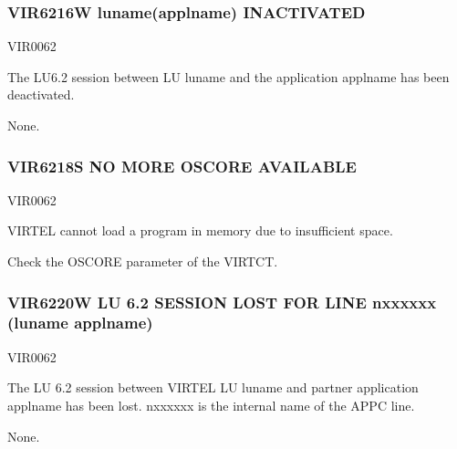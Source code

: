 \documentclass[letterpaper,10pt,english]{sphinxmanual}
\begin{document}
\subsubsection{VIR6216W luname(applname) INACTIVATED}
\label{\detokenize{messages:vir6216w-luname-applname-inactivated}}\begin{description}
\sphinxAtStartPar
VIR0062

\sphinxAtStartPar
The LU6.2 session between LU luname and the application applname has been deactivated.

\sphinxAtStartPar
None.

\end{description}


\subsubsection{VIR6218S NO MORE OSCORE AVAILABLE}
\label{\detokenize{messages:vir6218s-no-more-oscore-available}}\begin{description}
\sphinxAtStartPar
VIR0062

\sphinxAtStartPar
VIRTEL cannot load a program in memory due to insufficient space.

\sphinxAtStartPar
Check the OSCORE parameter of the VIRTCT.

\end{description}


\subsubsection{VIR6220W LU 6.2 SESSION LOST FOR LINE n\sphinxhyphen{}xxxxxx (luname \textendash{} applname)}
\label{\detokenize{messages:vir6220w-lu-6-2-session-lost-for-line-n-xxxxxx-luname-applname}}\begin{description}
\sphinxAtStartPar
VIR0062

\sphinxAtStartPar
The LU 6.2 session between VIRTEL LU luname and partner application applname has been lost. n\sphinxhyphen{}xxxxxx is the internal name of the APPC line.

\sphinxAtStartPar
None.

\end{description}
\end{document}

